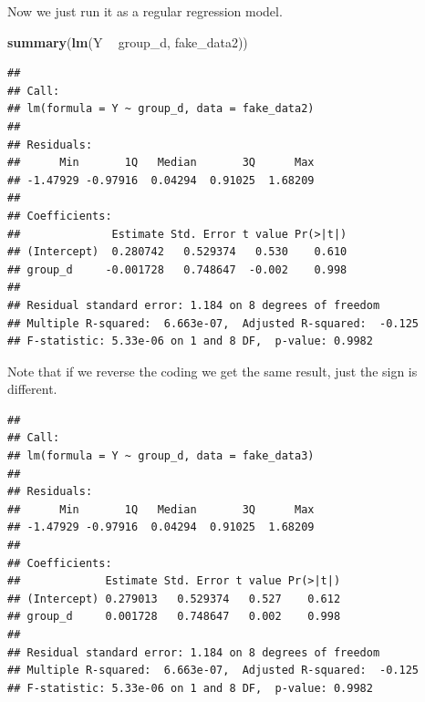 \documentclass[]{book}
\newenvironment{Shaded}{\begin{snugshade}}{\end{snugshade}}
\newcommand{\DataTypeTok}[1]{\textcolor[rgb]{0.13,0.29,0.53}{#1}}
\newcommand{\DecValTok}[1]{\textcolor[rgb]{0.00,0.00,0.81}{#1}}
\newcommand{\KeywordTok}[1]{\textcolor[rgb]{0.13,0.29,0.53}{\textbf{#1}}}
\newcommand{\NormalTok}[1]{#1}
\newcommand{\OperatorTok}[1]{\textcolor[rgb]{0.81,0.36,0.00}{\textbf{#1}}}
\newcommand{\StringTok}[1]{\textcolor[rgb]{0.31,0.60,0.02}{#1}}
\begin{document}
Now we just run it as a regular regression model.

\begin{Shaded}
\begin{Highlighting}[]
\KeywordTok{summary}\NormalTok{(}\KeywordTok{lm}\NormalTok{(Y }\OperatorTok{~}\StringTok{ }\NormalTok{group_d, fake_data2))}
\end{Highlighting}
\end{Shaded}

\begin{verbatim}
## 
## Call:
## lm(formula = Y ~ group_d, data = fake_data2)
## 
## Residuals:
##      Min       1Q   Median       3Q      Max 
## -1.47929 -0.97916  0.04294  0.91025  1.68209 
## 
## Coefficients:
##              Estimate Std. Error t value Pr(>|t|)
## (Intercept)  0.280742   0.529374   0.530    0.610
## group_d     -0.001728   0.748647  -0.002    0.998
## 
## Residual standard error: 1.184 on 8 degrees of freedom
## Multiple R-squared:  6.663e-07,	Adjusted R-squared:  -0.125 
## F-statistic: 5.33e-06 on 1 and 8 DF,  p-value: 0.9982
\end{verbatim}

Note that if we reverse the coding we get the same result, just the sign is different.

\begin{Shaded}
\end{Shaded}

\begin{verbatim}
## 
## Call:
## lm(formula = Y ~ group_d, data = fake_data3)
## 
## Residuals:
##      Min       1Q   Median       3Q      Max 
## -1.47929 -0.97916  0.04294  0.91025  1.68209 
## 
## Coefficients:
##             Estimate Std. Error t value Pr(>|t|)
## (Intercept) 0.279013   0.529374   0.527    0.612
## group_d     0.001728   0.748647   0.002    0.998
## 
## Residual standard error: 1.184 on 8 degrees of freedom
## Multiple R-squared:  6.663e-07,	Adjusted R-squared:  -0.125 
## F-statistic: 5.33e-06 on 1 and 8 DF,  p-value: 0.9982
\end{verbatim}
\end{document}
